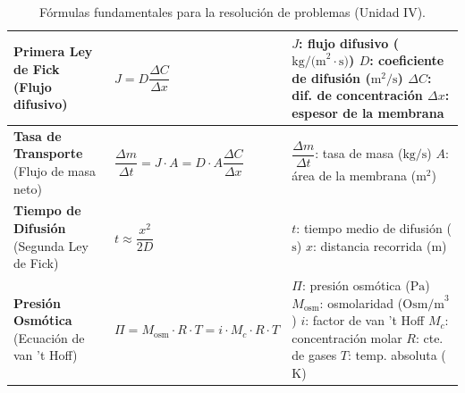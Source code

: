 \documentclass[12pt,letterpaper]{article}
\begin{document}
\begin{table}[h!]
{\begin{tabular}{|>{\raggedright\arraybackslash}p{4cm}|>{\centering\arraybackslash}p{5.5cm}|>{\raggedright\arraybackslash}p{5cm}|}
        \hline
        \textbf{Primera Ley de Fick} \newline (Flujo difusivo) & $J = D \dfrac{\Delta C}{\Delta x}$ & $J$: flujo difusivo ($\text{kg/(m}^2\cdot\text{s)}$) \newline $D$: coeficiente de difusión ($\text{m}^2\text{/s}$) \newline $\Delta C$: dif. de concentración \newline $\Delta x$: espesor de la membrana \\
        \hline
        \textbf{Tasa de Transporte} \newline (Flujo de masa neto) & $\dfrac{\Delta m}{\Delta t} = J \cdot A = D \cdot A \dfrac{\Delta C}{\Delta x}$ & $\dfrac{\Delta m}{\Delta t}$: tasa de masa ($\text{kg/s}$) \newline $A$: área de la membrana ($\text{m}^2$) \\
        \hline
        \textbf{Tiempo de Difusión} \newline (Segunda Ley de Fick) & $t \approx \dfrac{x^2}{2D}$ & $t$: tiempo medio de difusión ($\text{s}$) \newline $x$: distancia recorrida ($\text{m}$) \\
        \hline
        \textbf{Presión Osmótica} \newline (Ecuación de van 't Hoff) & $\Pi = M_{\text{osm}} \cdot R \cdot T = i \cdot M_c \cdot R \cdot T$ & $\Pi$: presión osmótica ($\text{Pa}$) \newline $M_{\text{osm}}$: osmolaridad ($\text{Osm/m}^3$) \newline $i$: factor de van 't Hoff \newline $M_c$: concentración molar \newline $R$: cte. de gases \newline $T$: temp. absoluta ($\text{K}$) \\
        \hline
    \end{tabular}
    }
    \vspace{0.3cm}
    \caption{Fórmulas fundamentales para la resolución de problemas (Unidad IV).}
    \label{tab:formulas_u4}
\end{table}

\vspace{0.4cm}
\end{document}
